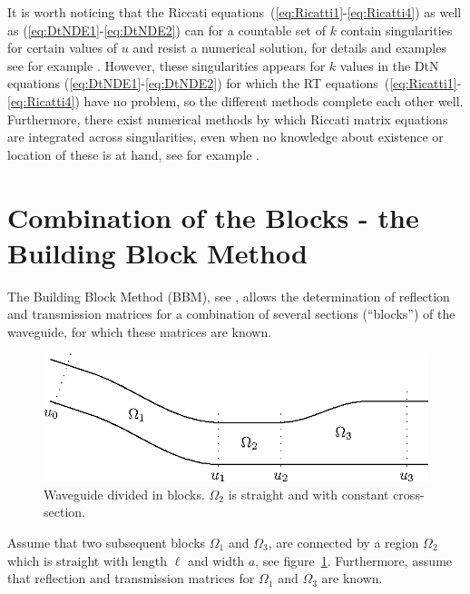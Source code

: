 \documentclass[numreferences]{kluwer}
\begin{document}
It is worth noticing that the Riccati
equations~(\ref{eq:Ricatti1}-\ref{eq:Ricatti4}) as well as
(\ref{eq:DtNDE1}-\ref{eq:DtNDE2}) can for a countable set of $k$
contain singularities for certain values of $u$ and resist a numerical
solution, for details and examples see for example
\cite{Fishman:1998}. However, these singularities appears for $k$
values in the DtN equations (\ref{eq:DtNDE1}-\ref{eq:DtNDE2}) for
which the RT equations~(\ref{eq:Ricatti1}-\ref{eq:Ricatti4}) have no
problem, so the different methods complete each other
well. Furthermore, there exist numerical methods by which Riccati
matrix equations are integrated across singularities, even when no
knowledge about existence or location of these is at hand, see for
example \cite{Li-Kahan:2012}.


\section{Combination of the Blocks - the Building
Block Method}
\label{sec:comb-blocks-build}

The Building Block Method (BBM), see \cite{nilssonbrander1981b},
allows the determination of reflection and transmission matrices for
a combination of several sections (``blocks'') of the waveguide, for
which these matrices are known.

\begin{figure}[htb]
  \centering
  \includegraphics[width=\textwidth]{BBMwg-1}
  \caption{Waveguide divided in blocks. $\Omega_2$ is straight and
    with constant cross-section.}
  \label{fig:wg4}
\end{figure}


Assume that two subsequent blocks $\Omega_1$ and $\Omega_3$, are
connected by a region $\Omega_2$ which is straight with length $\ell$ and width $a$, see figure~\ref{fig:wg4}.  Furthermore, assume that
reflection and transmission matrices for $\Omega_1$
and $\Omega_3$ are known.
\end{document}
